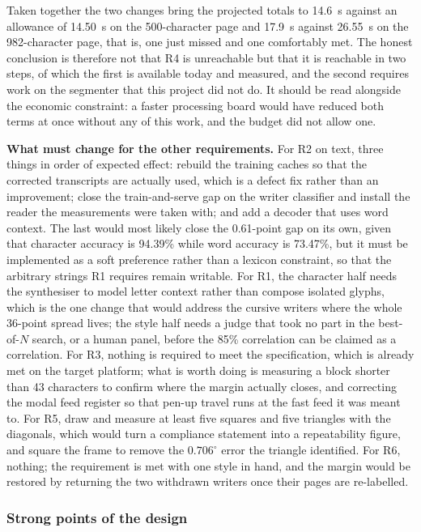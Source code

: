         Taken together the two changes bring the projected totals to 14.6~s against an allowance of 14.50~s on the 500-character page and 17.9~s against 26.55~s on the 982-character page, that is, one just missed and one comfortably met.
        The honest conclusion is therefore not that R4 is unreachable but that it is reachable in two steps, of which the first is available today and measured, and the second requires work on the segmenter that this project did not do.
        It should be read alongside the economic constraint: a faster processing board would have reduced both terms at once without any of this work, and the budget did not allow one.

        \textbf{What must change for the other requirements.}
        For R2 on text, three things in order of expected effect: rebuild the training caches so that the corrected transcripts are actually used, which is a defect fix rather than an improvement; close the train-and-serve gap on the writer classifier and install the reader the measurements were taken with; and add a decoder that uses word context.
        The last would most likely close the 0.61-point gap on its own, given that character accuracy is 94.39\% while word accuracy is 73.47\%, but it must be implemented as a soft preference rather than a lexicon constraint, so that the arbitrary strings R1 requires remain writable.
        For R1, the character half needs the synthesiser to model letter context rather than compose isolated glyphs, which is the one change that would address the cursive writers where the whole 36-point spread lives; the style half needs a judge that took no part in the best-of-$N$ search, or a human panel, before the 85\% correlation can be claimed as a correlation.
        For R3, nothing is required to meet the specification, which is already met on the target platform; what is worth doing is measuring a block shorter than 43 characters to confirm where the margin actually closes, and correcting the modal feed register so that pen-up travel runs at the fast feed it was meant to.
        For R5, draw and measure at least five squares and five triangles with the diagonals, which would turn a compliance statement into a repeatability figure, and square the frame to remove the $0.706^{\circ}$ error the triangle identified.
        For R6, nothing; the requirement is met with one style in hand, and the margin would be restored by returning the two withdrawn writers once their pages are re-labelled.

    \subsubsection{Strong points of the design}
    \label{sec:dis-strong}

